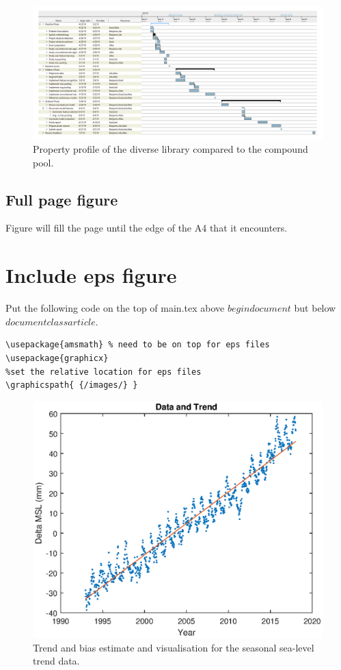 
\begin{figure}
\hspace*{-4cm}   
    \includegraphics[width = 775pt]{images/ganttV4horizontal.png}
    \caption{Property profile of the diverse library compared to the compound pool.}
    \label{fig:PropProf}
\end{figure}

\subsection{Full page figure}
Figure will fill the page until the edge of the A4 that it encounters.


\section{Include eps figure}
Put the following code on the top of main.tex above $begin document$ but below $documentclass{article}$.
\begin{verbatim}
\usepackage{amsmath} % need to be on top for eps files
\usepackage{graphicx}
%set the relative location for eps files
\graphicspath{ {/images/} }
\end{verbatim}

\begin{figure}
    \centering
    \includegraphics{images/q1a.eps}
    \caption{Trend and bias estimate and visualisation for the seasonal sea-level trend data.}
    \label{fig:plot_q1a}
\end{figure}